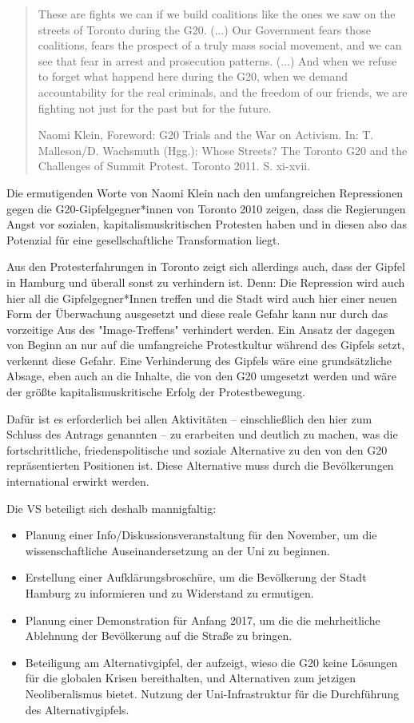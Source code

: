 \documentclass[ngerman,headheight=70pt]{scrartcl}
\begin{document}
    \blockquote[Naomi Klein, Foreword: G20 Trials and the War on Activism. In:
    T. Malleson/D. Wachsmuth (Hgg.): Whose Streets? The Toronto G20 and the
    Challenges of Summit Protest. Toronto 2011. S. xi-xvii.]{
    These are fights we can if we build coalitions like the ones we saw on the
    streets of Toronto during the G20. (...) Our Government fears those
    coalitions, fears the prospect of a truly mass social movement, and we can
    see that fear in arrest and prosecution patterns. (...) And when we refuse
    to forget what happend here during the G20, when we demand accountability
    for the real criminals, and the	freedom of our friends, we are fighting not
    just for the past but for the future.}

    Die ermutigenden Worte von Naomi Klein nach den umfangreichen Repressionen
    gegen die G20-Gipfelgegner*innen von Toronto 2010 zeigen, dass die Regierungen
    Angst vor sozialen, kapitalismuskritischen Protesten haben und in diesen also
    das Potenzial für eine gesellschaftliche Transformation liegt.

    Aus den Protesterfahrungen in Toronto zeigt sich allerdings auch, dass der
    Gipfel in Hamburg und überall sonst zu verhindern ist. Denn: Die Repression
    wird auch hier all die Gipfelgegner*Innen treffen und die Stadt wird auch
    hier einer neuen Form der Überwachung ausgesetzt und diese reale Gefahr kann
    nur durch das vorzeitige Aus des "Image-Treffens" verhindert werden. Ein
    Ansatz der dagegen von Beginn an nur auf die umfangreiche Protestkultur
    während des Gipfels setzt, verkennt diese Gefahr. Eine Verhinderung des Gipfels
    wäre eine grundsätzliche Absage, eben auch an die Inhalte, die von den G20
    umgesetzt werden und wäre der größte kapitalismuskritische Erfolg der
    Protestbewegung.

    Dafür ist es erforderlich bei allen Aktivitäten -- einschließlich den hier
    zum Schluss des Antrags genannten -- zu erarbeiten und deutlich zu machen,
    was die fortschrittliche, friedenspolitische und soziale Alternative zu
    den von den G20 repräsentierten Positionen ist. Diese Alternative muss
    durch die Bevölkerungen international erwirkt werden.

    Die VS beteiligt sich deshalb mannigfaltig:
    \begin{itemize}
        \item Planung einer Info/Diskussionsveranstaltung für den November, um
              die wissenschaftliche Auseinandersetzung an der Uni zu beginnen.
        \item Erstellung einer Aufklärungsbroschüre, um die Bevölkerung der Stadt
              Hamburg zu informieren und zu Widerstand zu ermutigen.
	    \item Planung einer Demonstration für Anfang 2017, um die die mehrheitliche
              Ablehnung der Bevölkerung auf die Straße zu bringen.
        \item Beteiligung am Alternativgipfel, der aufzeigt, wieso die G20 keine
              Lösungen für die globalen Krisen bereithalten, und Alternativen zum
              jetzigen Neoliberalismus bietet. Nutzung der Uni-Infrastruktur
              für die Durchführung des Alternativgipfels.
    \end{itemize}
\end{document}
